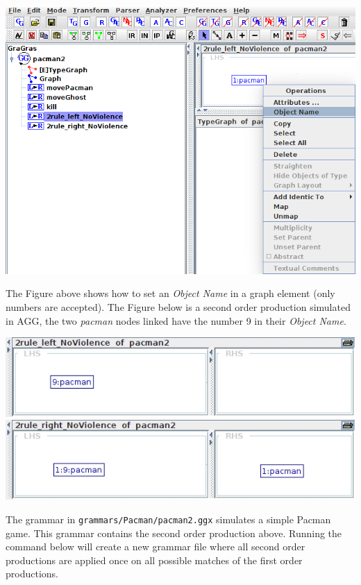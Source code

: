 \documentclass[12pt]{article}
\begin{document}
{\noindent\centering\includegraphics[scale = 0.5]{img/snd-order/objName.png}\\}

The Figure above shows how to set an \emph{Object Name} in a graph element (only numbers are accepted).
The Figure below is a second order production simulated in AGG, the two \emph{pacman} nodes linked have the number 9 in their \emph{Object Name}.

\begin{center}
\noindent\includegraphics[scale = 0.6]{img/snd-order/noViolenceLeft.png}\\
\noindent\includegraphics[scale = 0.6]{img/snd-order/noViolenceRight.png}\\
\end{center}

The grammar in \texttt{grammars/Pacman/pacman2.ggx} simulates a simple Pacman game.
This grammar contains the second order production above.
Running the command below will create a new grammar file where all second order productions are applied once on all possible matches of the first order productions.
\end{document}
